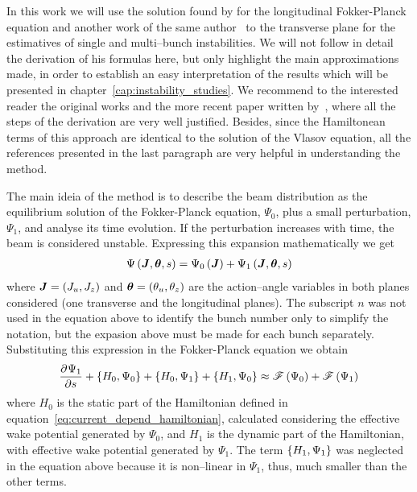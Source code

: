     In this work we will use the solution found by  for the longitudinal Fokker-Planck equation and another work of the same author~\cite{Suzuki1986} to the transverse plane for the estimatives of single and multi--bunch instabilities. We will not follow in detail the derivation of his formulas here, but only highlight the main approximations made, in order to establish an easy interpretation of the results which will be presented in chapter~\ref{cap:instability_studies}. We recommend to the interested reader the original works and the more recent paper written by~, where all the steps of the derivation are very well justified. Besides, since the Hamiltonean terms of this approach are identical to the solution of the Vlasov equation, all the references presented in the last paragraph are very helpful in understanding the method.

    The main ideia of the method is to describe the beam distribution as the equilibrium solution of the Fokker-Planck equation, $\Psi_0$, plus a small perturbation, $\Psi_1$, and analyse its time evolution. If the perturbation increases with time, the beam is considered unstable. Expressing this expansion mathematically we get
    \begin{align}
        \Psi\left(\boldsymbol{J},\boldsymbol{\theta}, s\right) = \Psi_0\left(\boldsymbol{J}\right) + \Psi_1\left(\boldsymbol{J},\boldsymbol{\theta}, s\right)
    \end{align}
    where $\boldsymbol{J}=(J_u,J_z)$ and $\boldsymbol{\theta}=(\theta_u,\theta_z)$ are the action--angle variables in both planes considered (one transverse and the longitudinal planes). The subscript $n$ was not used in the equation above to identify the bunch number only to simplify the notation, but the expasion above must be made for each bunch separately. Substituting this expression in the Fokker-Planck equation we obtain
    \begin{align}
        \frac{\partial^{{}}\Psi_1}{\partial s^{{}}} +  \left\{ H_0, \Psi_0 \right\} + \left\{ H_0, \Psi_1 \right\} +
        \left\{ H_1, \Psi_0 \right\} \approx \mathscr{F}\left(\Psi_0\right) + \mathscr{F}\left(\Psi_1\right)
    \end{align}
    where $H_0$ is the static part of the Hamiltonian defined in equation~\eqref{eq:current_depend_hamiltonian}, calculated considering the effective wake potential generated by $\Psi_0$, and $H_1$ is the dynamic part of the Hamiltonian, with effective wake potential generated by $\Psi_1$. The term $\left\{ H_1,\Psi_1 \right\}$ was neglected in the equation above because it is non--linear in $\Psi_1$, thus, much smaller than the other terms.

